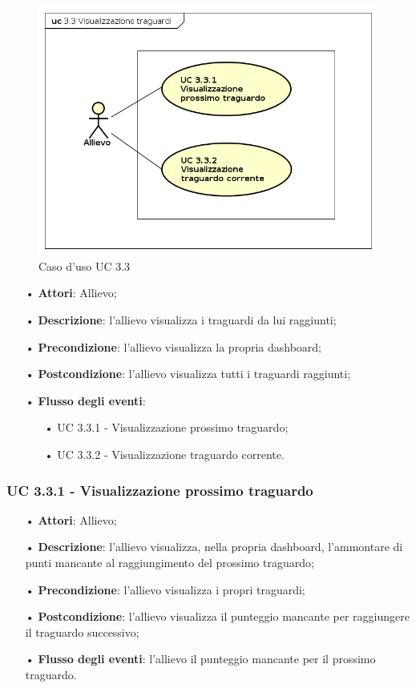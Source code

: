\begin{figure}[H]
\centering
\includegraphics[scale=0.7]{img/UC33.png} 
\caption{Caso d'uso UC 3.3}
\end{figure}
\begin{itemize}
\item[•]\textbf{Attori}: Allievo;
\item[•]\textbf{Descrizione}: l'allievo visualizza i traguardi da lui raggiunti;
\item[•]\textbf{Precondizione}: l'allievo visualizza la propria dashboard;
\item[•]\textbf{Postcondizione}: l'allievo visualizza tutti i traguardi raggiunti;
\item[•]\textbf{Flusso degli eventi}: 
	\begin{itemize}
		\item[•] UC 3.3.1 - Visualizzazione prossimo traguardo;
		\item[•] UC 3.3.2 - Visualizzazione traguardo corrente.
	\end{itemize}
\end{itemize}

\subsubsection{UC 3.3.1 - Visualizzazione prossimo traguardo}
\begin{itemize}
\item[•]\textbf{Attori}: Allievo;
\item[•] \textbf{Descrizione}: l'allievo visualizza, nella propria dashboard, l'ammontare di punti mancante al raggiungimento del prossimo traguardo;
\item[•] \textbf{Precondizione}: l'allievo visualizza i propri traguardi;
\item[•] \textbf{Postcondizione}: l'allievo visualizza il punteggio mancante per raggiungere il traguardo successivo;
\item[•] \textbf{Flusso degli eventi}: l'allievo il punteggio mancante per il prossimo traguardo.
\end{itemize}


